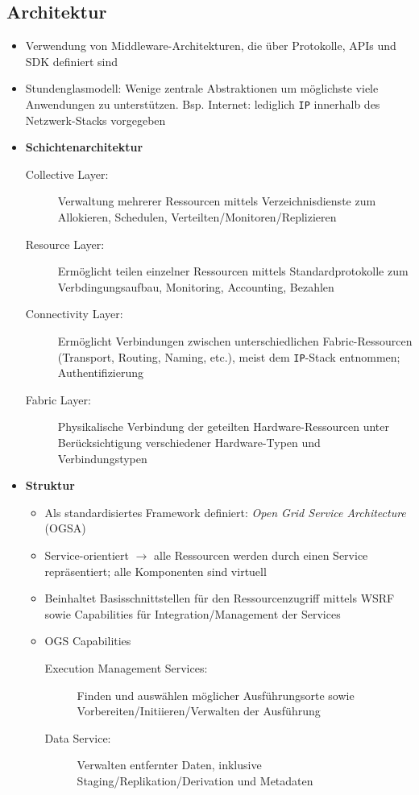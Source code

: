 \subsection{Architektur}
\begin{itemize}
	\item Verwendung von Middleware-Architekturen, die über Protokolle, APIs und SDK definiert sind
	\item Stundenglasmodell: Wenige zentrale Abstraktionen um möglichste viele Anwendungen zu unterstützen. Bsp. Internet: lediglich \texttt{IP} innerhalb des Netzwerk-Stacks vorgegeben
	\item \textbf{Schichtenarchitektur}
	\begin{description}
		\item[Collective Layer:] Verwaltung mehrerer Ressourcen mittels Verzeichnisdienste zum Allokieren, Schedulen, Verteilten/Monitoren/Replizieren
		\item[Resource Layer:] Ermöglicht teilen einzelner Ressourcen mittels Standardprotokolle zum Verbdingungsaufbau, Monitoring, Accounting, Bezahlen
		\item[Connectivity Layer:] Ermöglicht Verbindungen zwischen unterschiedlichen Fabric-Ressourcen (Transport, Routing, Naming, etc.), meist dem \texttt{IP}-Stack entnommen; Authentifizierung
		\item[Fabric Layer:] Physikalische Verbindung der geteilten Hardware-Ressourcen unter Berücksichtigung verschiedener Hardware-Typen und Verbindungstypen
	\end{description}
	\item \textbf{Struktur}
	\begin{itemize}
		\item Als standardisiertes Framework definiert: \textit{Open Grid Service Architecture} (OGSA)
		\item Service-orientiert \(\rightarrow\) alle Ressourcen werden durch einen Service repräsentiert; alle Komponenten sind virtuell
		\item Beinhaltet Basisschnittstellen für den Ressourcenzugriff mittels WSRF sowie Capabilities für Integration/Management der Services
		\item OGS Capabilities
		\begin{description}
			\item[Execution Management Services:] Finden und auswählen möglicher Ausführungsorte sowie Vorbereiten/Initiieren/Verwalten der Ausführung
			\item[Data Service:] Verwalten entfernter Daten, inklusive Staging/Replikation/Derivation und Metadaten

\end{description}
\end{itemize}
\end{itemize}
